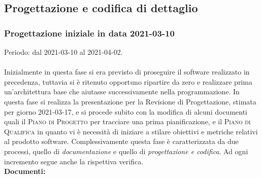\documentclass[../piano_di_progetto.tex]{subfiles}
\begin{document}

\subsection{Progettazione e codifica di dettaglio}%
\label{sub:prog_dett}
\subsubsection{Progettazione iniziale in data 2021-03-10}
Periodo: dal 2021-03-10 al 2021-04-02.\\ \\
Inizialmente in questa fase si era previsto di proseguire il software realizzato in precedenza, tuttavia si è ritenuto opportuno ripartire da zero e realizzare prima un'architettura 
base che aiutasse successivamente nella programmazione. 
In questa fase si realizza la presentazione per la Revisione di Progettazione, stimata per giorno 2021-03-17, e si procede subito con la modifica di alcuni documenti quali
il \textsc{Piano di Progetto} per tracciare una prima pianificazione, e il \textsc{Piano di Qualifica} in quanto vi è necessità di iniziare a stilare obiettivi e metriche relativi al prodotto software.
Complessivamente questa fase è caratterizzata da due processi, quello di \emph{documentazione} e quello di \emph{progettazione e codifica}. Ad ogni incremento segue anche la rispettiva verifica. \\
\textbf{Documenti:}
\end{document}
